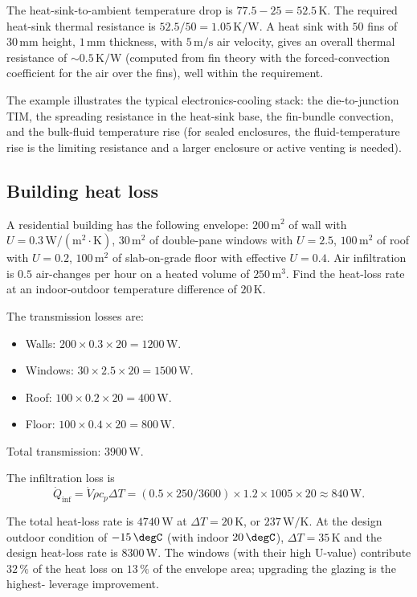 The heat-sink-to-ambient temperature drop is $77.5 - 25 = 52.5\,\si{
\kelvin}$. The required heat-sink thermal resistance is $52.5/50 = 1.05
\,\si{\kelvin}/\text{W}$. A heat sink with $50$ fins of $30\,\si{
\milli\meter}$ height, $1\,\si{\milli\meter}$ thickness, with $5\,
\text{m/s}$ air velocity, gives an overall thermal resistance of
$\sim 0.5\,\si{\kelvin}/\text{W}$ (computed from fin theory with the
forced-convection coefficient for the air over the fins), well within
the requirement.

The example illustrates the typical electronics-cooling stack: the
die-to-junction TIM, the spreading resistance in the heat-sink base,
the fin-bundle convection, and the bulk-fluid temperature rise (for
sealed enclosures, the fluid-temperature rise is the limiting
resistance and a larger enclosure or active venting is needed).

\subsection{Building heat loss}

A residential building has the following envelope: $200\,\text{m}^2$
of wall with $U = 0.3\,\text{W}/(\text{m}^2\cdot\si{\kelvin})$, $30\,
\text{m}^2$ of double-pane windows with $U = 2.5$, $100\,\text{m}^2$
of roof with $U = 0.2$, $100\,\text{m}^2$ of slab-on-grade floor with
effective $U = 0.4$. Air infiltration is $0.5$ air-changes per hour
on a heated volume of $250\,\text{m}^3$. Find the heat-loss rate at
an indoor-outdoor temperature difference of $20\,\si{\kelvin}$.

The transmission losses are:
\begin{itemize}[leftmargin=*]
  \item Walls: $200 \times 0.3 \times 20 = 1200\,\text{W}$.
  \item Windows: $30 \times 2.5 \times 20 = 1500\,\text{W}$.
  \item Roof: $100 \times 0.2 \times 20 = 400\,\text{W}$.
  \item Floor: $100 \times 0.4 \times 20 = 800\,\text{W}$.
\end{itemize}
Total transmission: $3900\,\text{W}$.

The infiltration loss is
\[
\dot{Q}_{\text{inf}} = \dot{V} \rho c_p \Delta T = (0.5 \times 250/3600)
\times 1.2 \times 1005 \times 20 \approx 840\,\text{W}.
\]

The total heat-loss rate is $4740\,\text{W}$ at $\Delta T = 20\,\si{
\kelvin}$, or $237\,\text{W}/\si{\kelvin}$. At the design outdoor
condition of $-15\,\degC$ (with indoor $20\,\degC$), $\Delta T = 35\,
\si{\kelvin}$ and the design heat-loss rate is $8300\,\text{W}$. The
windows (with their high U-value) contribute $32\,\%$ of the heat loss
on $13\,\%$ of the envelope area; upgrading the glazing is the highest-
leverage improvement.

